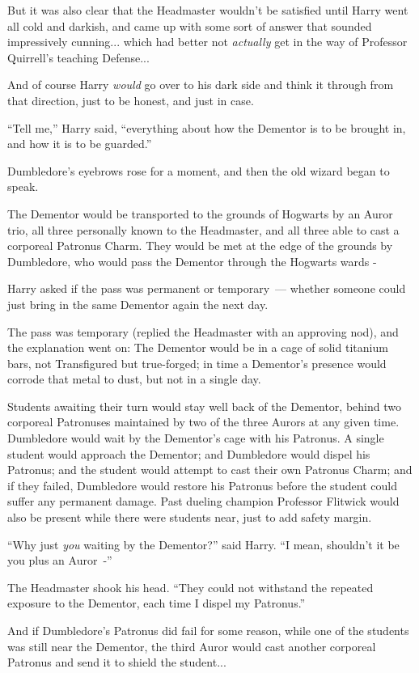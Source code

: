 But it was also clear that the Headmaster wouldn't be satisfied until Harry went all cold and darkish, and came up with some sort of answer that sounded impressively cunning... which had better not \emph{actually} get in the way of Professor Quirrell's teaching Defense...

And of course Harry \emph{would} go over to his dark side and think it through from that direction, just to be honest, and just in case.

``Tell me,'' Harry said, ``everything about how the Dementor is to be brought in, and how it is to be guarded.''

Dumbledore's eyebrows rose for a moment, and then the old wizard began to speak.

The Dementor would be transported to the grounds of Hogwarts by an Auror trio, all three personally known to the Headmaster, and all three able to cast a corporeal Patronus Charm. They would be met at the edge of the grounds by Dumbledore, who would pass the Dementor through the Hogwarts wards -

Harry asked if the pass was permanent or temporary~--- whether someone could just bring in the same Dementor again the next day.

The pass was temporary (replied the Headmaster with an approving nod), and the explanation went on: The Dementor would be in a cage of solid titanium bars, not Transfigured but true-forged; in time a Dementor's presence would corrode that metal to dust, but not in a single day.

Students awaiting their turn would stay well back of the Dementor, behind two corporeal Patronuses maintained by two of the three Aurors at any given time. Dumbledore would wait by the Dementor's cage with his Patronus. A single student would approach the Dementor; and Dumbledore would dispel his Patronus; and the student would attempt to cast their own Patronus Charm; and if they failed, Dumbledore would restore his Patronus before the student could suffer any permanent damage. Past dueling champion Professor Flitwick would also be present while there were students near, just to add safety margin.

``Why just \emph{you} waiting by the Dementor?'' said Harry. ``I mean, shouldn't it be you plus an Auror~-''

The Headmaster shook his head. ``They could not withstand the repeated exposure to the Dementor, each time I dispel my Patronus.''

And if Dumbledore's Patronus did fail for some reason, while one of the students was still near the Dementor, the third Auror would cast another corporeal Patronus and send it to shield the student...

